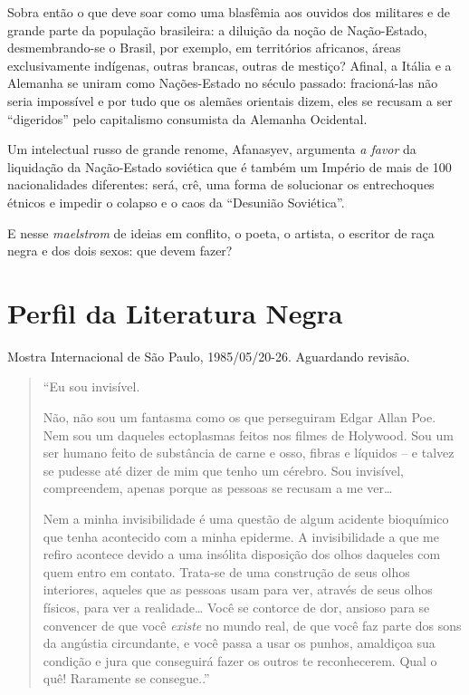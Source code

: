 \documentclass[
  letterpaper,
  DIV=11,
  numbers=noendperiod]{scrreprt}
\begin{document}
Sobra então o que deve soar como uma blasfêmia aos ouvidos dos militares
e de grande parte da população brasileira: a diluição da noção de
Nação-Estado, desmembrando-se o Brasil, por exemplo, em territórios
africanos, áreas exclusivamente indígenas, outras brancas, outras de
mestiço? Afinal, a Itália e a Alemanha se uniram como Nações-Estado no
século passado: fracioná-las não seria impossível e por tudo que os
alemães orientais dizem, eles se recusam a ser ``digeridos'' pelo
capitalismo consumista da Alemanha Ocidental.

Um intelectual russo de grande renome, Afanasyev, argumenta \emph{a
favor} da liquidação da Nação-Estado soviética que é também um Império
de mais de 100 nacionalidades diferentes: será, crê, uma forma de
solucionar os entrechoques étnicos e impedir o colapso e o caos da
``Desunião Soviética''.

E nesse \emph{maelstrom} de ideias em conflito, o poeta, o artista, o
escritor de raça negra e dos dois sexos: que devem fazer?


\chapter{Perfil da Literatura Negra}\label{perfil-da-literatura-negra}

Mostra Internacional de São Paulo, 1985/05/20-26. Aguardando revisão.

\hfill\break

\begin{quote}
``Eu sou invisível.

Não, não sou um fantasma como os que perseguiram Edgar Allan Poe. Nem
sou um daqueles ectoplasmas feitos nos filmes de Holywood. Sou um ser
humano feito de substância de carne e osso, fibras e líquidos -- e
talvez se pudesse até dizer de mim que tenho um cérebro. Sou invisível,
compreendem, apenas porque as pessoas se recusam a me ver\ldots{}

Nem a minha invisibilidade é uma questão de algum acidente bioquímico
que tenha acontecido com a minha epiderme. A invisibilidade a que me
refiro acontece devido a uma insólita disposição dos olhos daqueles com
quem entro em contato. Trata-se de uma construção de seus olhos
interiores, aqueles que as pessoas usam para ver, através de seus olhos
físicos, para ver a realidade\ldots{} Você se contorce de dor, ansioso
para se convencer de que você \emph{existe} no mundo real, de que você
faz parte dos sons da angústia circundante, e você passa a usar os
punhos, amaldiçoa sua condição e jura que conseguirá fazer os outros te
reconhecerem. Qual o quê! Raramente se consegue..''
\end{quote}
\end{document}
